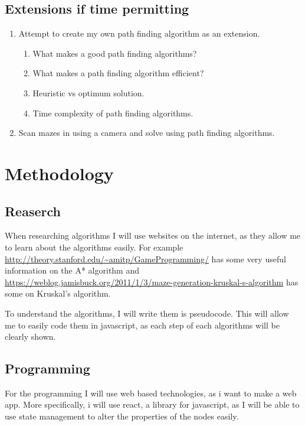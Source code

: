 \documentclass{article}
\begin{document}
\subsection{Extensions if time permitting}
\begin{enumerate}
    \item Attempt to create my own path finding algorithm as an extension.
    \begin{enumerate}
        \item What makes a good path finding algorithms?
        \item What makes a path finding algorithm efficient?
        \item Heuristic vs optimum solution.
        \item Time complexity of path finding algorithms.
    \end{enumerate}
    \item Scan mazes in using a camera and solve using path finding algorithms.
\end{enumerate}
\section{Methodology}
\subsection{Reaserch}
When researching algorithms I will use websites on the internet, as they allow me to learn about the algorithms easily. For example \url{http://theory.stanford.edu/~amitp/GameProgramming/} has some very useful information on the A* algorithm and \url{https://weblog.jamisbuck.org/2011/1/3/maze-generation-kruskal-s-algorithm} has some on Kruskal's algorithm.

To understand the algorithms, I will write them is pseudocode. This will allow me to easily code them in javascript, as each step of each algorithms will be clearly shown.

\subsection{Programming}
For the programming I will use web based technologies, as i want to make a web app. More specifically, i will use react, a library for javascript, as I will be able to use state management to alter the properties of the nodes easily.  
\end{document}
